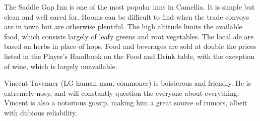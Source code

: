 The Saddle Gap Inn is one of the most popular inns in Camellia.
It is simple but clean and well cared for.
Rooms can be difficult to find when the trade convoys are in town but are otherwise plentiful.
The high altitude limits the available food, which consists largely of leafy greens and root vegetables.
The local ale are based on herbs in place of hops.
Food and beverages are sold at double the prices listed in the Player's Handbook on the Food and Drink table, with the exception of wine, which is largely unavailable.

Vincent Tavenner (LG human man, commoner) is boisterous and friendly.
He is extremely nosy, and will constantly question the everyone about everything.
Vincent is also a notorious gossip, making him a great source of rumors, albeit with dubious reliability.
